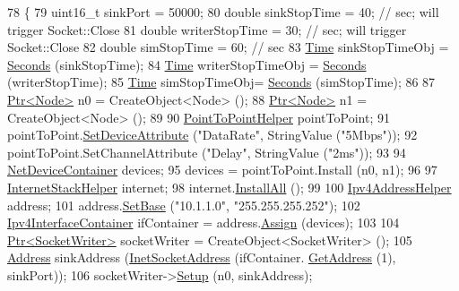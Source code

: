 \begin{DoxyCode}
78 \{
79   uint16\_t sinkPort = 50000;
80   \textcolor{keywordtype}{double} sinkStopTime = 40;  \textcolor{comment}{// sec; will trigger Socket::Close}
81   \textcolor{keywordtype}{double} writerStopTime = 30;  \textcolor{comment}{// sec; will trigger Socket::Close}
82   \textcolor{keywordtype}{double} simStopTime = 60;  \textcolor{comment}{// sec}
83   \hyperlink{classns3_1_1Time}{Time} sinkStopTimeObj = \hyperlink{group__timecivil_ga33c34b816f8ff6628e33d5c8e9713b9e}{Seconds} (sinkStopTime);
84   \hyperlink{classns3_1_1Time}{Time} writerStopTimeObj = \hyperlink{group__timecivil_ga33c34b816f8ff6628e33d5c8e9713b9e}{Seconds} (writerStopTime);
85   \hyperlink{classns3_1_1Time}{Time} simStopTimeObj= \hyperlink{group__timecivil_ga33c34b816f8ff6628e33d5c8e9713b9e}{Seconds} (simStopTime);
86 
87   \hyperlink{classns3_1_1Ptr}{Ptr<Node>} n0 = CreateObject<Node> ();
88   \hyperlink{classns3_1_1Ptr}{Ptr<Node>} n1 = CreateObject<Node> ();
89 
90   \hyperlink{classns3_1_1PointToPointHelper}{PointToPointHelper} pointToPoint;
91   pointToPoint.\hyperlink{classns3_1_1PointToPointHelper_a4577f5ab8c387e5528af2e0fbab1152e}{SetDeviceAttribute} (\textcolor{stringliteral}{"DataRate"}, StringValue (\textcolor{stringliteral}{"5Mbps"}));
92   pointToPoint.SetChannelAttribute (\textcolor{stringliteral}{"Delay"}, StringValue (\textcolor{stringliteral}{"2ms"}));
93 
94   \hyperlink{classns3_1_1NetDeviceContainer}{NetDeviceContainer} devices;
95   devices = pointToPoint.Install (n0, n1);
96 
97   \hyperlink{classns3_1_1InternetStackHelper}{InternetStackHelper} internet;
98   internet.\hyperlink{classns3_1_1InternetStackHelper_a6cfa73782fd4071c4cfbd73ebf1bbb44}{InstallAll} ();
99 
100   \hyperlink{classns3_1_1Ipv4AddressHelper}{Ipv4AddressHelper} address;
101   address.\hyperlink{classns3_1_1Ipv4AddressHelper_acf7b16dd25bac67e00f5e25f90a9a035}{SetBase} (\textcolor{stringliteral}{"10.1.1.0"}, \textcolor{stringliteral}{"255.255.255.252"});
102   \hyperlink{classns3_1_1Ipv4InterfaceContainer}{Ipv4InterfaceContainer} ifContainer = address.\hyperlink{classns3_1_1Ipv4AddressHelper_af8e7f4a1a7e74c00014a1eac445a27af}{Assign} (devices);
103 
104   \hyperlink{classns3_1_1Ptr}{Ptr<SocketWriter>} socketWriter = CreateObject<SocketWriter> ();
105   \hyperlink{classns3_1_1Address}{Address} sinkAddress (\hyperlink{classns3_1_1InetSocketAddress}{InetSocketAddress} (ifContainer.
      \hyperlink{classns3_1_1Ipv4InterfaceContainer_ae63208dcd222be986822937ee4aa828c}{GetAddress} (1), sinkPort));
106   socketWriter->\hyperlink{classns3_1_1SocketWriter_a79db65c3883555f22681d8ffabd206e4}{Setup} (n0, sinkAddress);

\end{DoxyCode}
